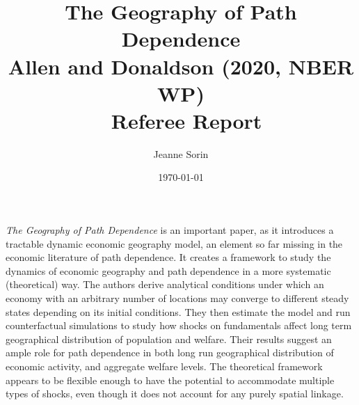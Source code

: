 \documentclass[10pt, final]{article}
\title{The Geography of Path Dependence \\Allen and Donaldson (2020, NBER WP) \\ Referee Report}
\author{Jeanne Sorin}
\date{\today}
\begin{document}
\maketitle
\newcommand{\hatxi}{\hat{\mathbf{x}}^i}
\newcommand{\tildexi}{\tilde{\mathbf{x}}^i}


\maketitle

\textit{The Geography of Path Dependence} is an important paper, as it introduces a tractable dynamic economic geography model, an element so far missing in the economic literature of path dependence. It creates a framework to study the dynamics of economic geography and path dependence in a more systematic (theoretical) way.
The authors derive analytical conditions under which an economy with an arbitrary number of locations may converge to different steady states depending on its initial conditions. They then estimate the model and run counterfactual simulations to study how shocks on fundamentals affect long term geographical distribution of population and welfare. 
Their results suggest an ample role for path dependence in both long run geographical distribution of economic activity, and aggregate welfare levels.
The theoretical framework appears to be flexible enough to have the potential to accommodate multiple types of shocks, even though it does not account for any purely spatial linkage.
\end{document}
